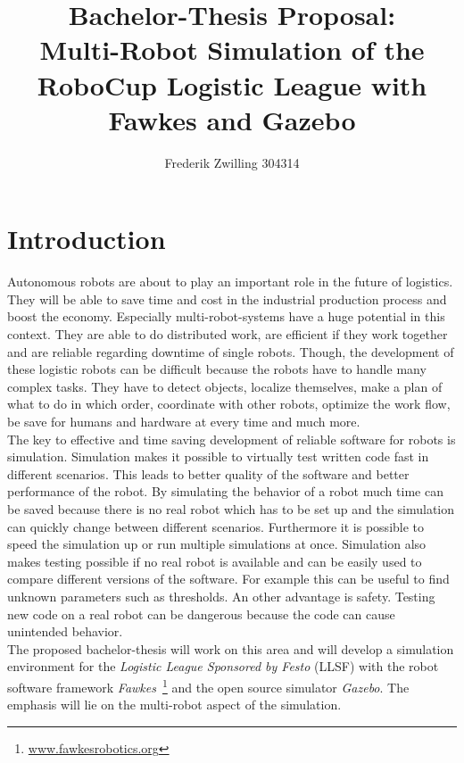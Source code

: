 \documentclass[11pt,a4paper,titlepage]{article}
\author{Frederik Zwilling 304314}
\title{Bachelor-Thesis Proposal:\\ Multi-Robot Simulation of the RoboCup Logistic League with Fawkes and Gazebo}
\begin{document}
\maketitle


\section{Introduction}
Autonomous robots are about to play an important role in the future of logistics. They will be able to save time and cost in the industrial production process and boost the economy. Especially multi-robot-systems have a huge potential in this context. They are able to do distributed work, are efficient if they work together and are reliable regarding downtime of single robots. Though, the development of these logistic robots can be difficult because the robots have to handle many complex tasks. They have to detect objects, localize themselves, make a plan of what to do in which order, coordinate with other robots, optimize the work flow, be save for humans and hardware at every time and much more.\\
The key to effective and time saving development of reliable software for robots is simulation. Simulation makes it possible to virtually test written code fast in different scenarios. This leads to better quality of the software and better performance of the robot. By simulating the behavior of a robot much time can be saved because there is no real robot which has to be set up and the simulation can quickly change between different scenarios. Furthermore it is possible to speed the simulation up or run multiple simulations at once. Simulation also makes testing possible if no real robot is available and can be easily used to compare different versions of the software. For example this can be useful to find unknown parameters such as thresholds. An other advantage is safety. Testing new code on a real robot can be dangerous because the code can cause unintended behavior.\\
The proposed bachelor-thesis will work on this area and will develop a simulation environment for the \textit{Logistic League Sponsored by Festo} (LLSF) with the robot software framework \textit{Fawkes}~\footnote{\url{www.fawkesrobotics.org}} and the open source simulator \textit{Gazebo}. The emphasis will lie on the multi-robot aspect of the simulation.
\end{document}
